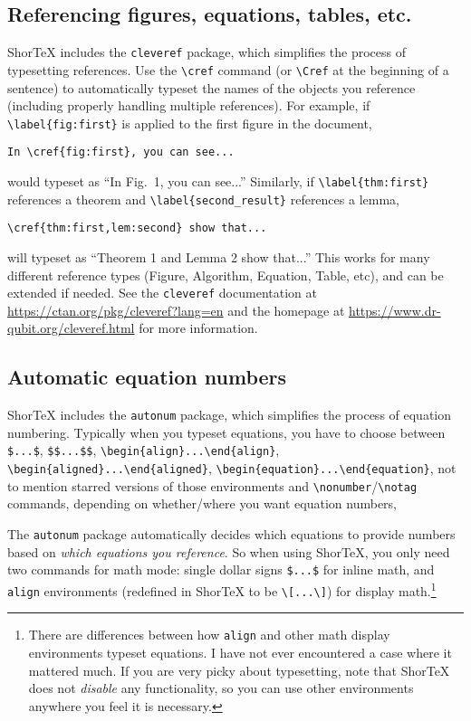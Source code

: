\documentclass{article}
\begin{document}
\subsection{Referencing figures, equations, tables, etc.}

ShorTeX includes the \texttt{cleveref} package, which simplifies the process
of typesetting references. Use the \verb!\cref! command (or \verb!\Cref! at the beginning of a sentence) 
to automatically typeset the names of the objects you reference (including properly handling multiple references). 
For example, if \verb!\label{fig:first}! is applied to the first figure in the document,
\begin{verbatim}
In \cref{fig:first}, you can see...
\end{verbatim}
would typeset as ``In Fig.~1, you can see...''
Similarly, if \verb!\label{thm:first}! references a theorem and \verb!\label{second_result}! references
a lemma, 
\begin{verbatim}
\cref{thm:first,lem:second} show that...
\end{verbatim}
will typeset as ``Theorem 1 and Lemma 2 show that...''
This works for many different reference types (Figure, Algorithm, Equation, Table, etc),
and can be extended if needed. See the \texttt{cleveref} documentation 
at \url{https://ctan.org/pkg/cleveref?lang=en} and the homepage at \url{https://www.dr-qubit.org/cleveref.html} 
for more information.

\subsection{Automatic equation numbers}

ShorTeX includes the \texttt{autonum} package, which simplifies the process of 
equation numbering. Typically when you typeset equations, you have to choose between 
\verb!$...$!, \verb!$$...$$!, 
\verb!\begin{align}...\end{align}!, 
\verb!\begin{aligned}...\end{aligned}!, 
\verb!\begin{equation}...\end{equation}!, 
not to mention starred versions of those environments 
and \verb!\nonumber!/\verb!\notag! commands, depending 
on whether/where you want equation numbers,

The \texttt{autonum} package automatically decides which equations to provide
numbers based on \textit{which equations you reference}. So when using ShorTeX,
you only need two commands for math mode: single dollar signs \verb!$...$! for
inline math, and \texttt{align} environments (redefined in ShorTeX to be
\verb!\[...\]!) for display math.\footnote{There are
differences between how \texttt{align} and 
other math display environments typeset equations. I have not ever
encountered a case where it mattered much. If you are very picky about typesetting,
note that ShorTeX does not \emph{disable} any functionality, so you 
can use other environments anywhere you feel it is necessary.}
\end{document}

